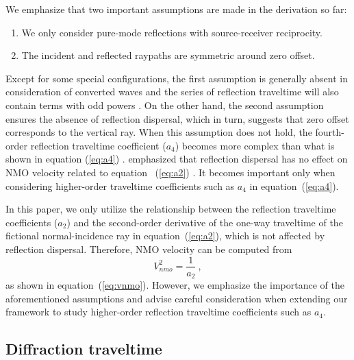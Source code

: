 We emphasize that two important assumptions are made in the derivation so far:
\begin{enumerate}
	\item We only consider pure-mode reflections with source-receiver reciprocity.
	\item The incident and reflected raypaths are symmetric around zero offset.
\end{enumerate}
Except for some special configurations, the first assumption is generally absent in consideration of converted waves and the series of reflection traveltime will also contain terms with odd powers \cite[]{tsvankin2011book,thomsenbook,korenravvetriclinic}. On the other hand, the second assumption ensures the absence of reflection dispersal, which in turn, suggests that zero offset corresponds to the vertical ray. When this assumption does not hold, the fourth-order reflection traveltime coefficient ($a_4$) becomes more complex than what is shown in equation (\ref{eq:a4}) \cite[]{pech2003,korenravvetriclinic}. \cite{nmoellipse} emphasized that reflection dispersal has no effect on NMO velocity related to equation ~(\ref{eq:a2}) \cite[]{hubralkrey}. It becomes important only when considering higher-order traveltime coefficients such as $a_4$ in equation~(\ref{eq:a4}).

In this paper, we only utilize the relationship between the reflection traveltime coefficients ($a_2$) and the second-order derivative of the one-way traveltime of the fictional normal-incidence ray in equation~(\ref{eq:a2}), which is not affected by reflection dispersal. Therefore, NMO velocity can be computed from
\begin{equation}
\label{eq:vnmoa}
V^2_{nmo} = \frac{1}{a_2}~,
\end{equation}
as shown in equation~(\ref{eq:vnmo}). However, we emphasize the importance of the aforementioned assumptions and advise careful consideration when extending our framework to study higher-order reflection traveltime coefficients such as $a_4$.

\subsection{Diffraction traveltime}

